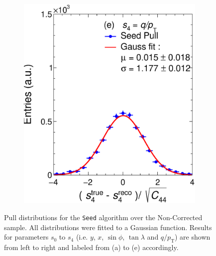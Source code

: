 \begin{figure}[t]
\begin{subfigure}{0.32\textwidth}
         \includegraphics[width=\textwidth]{figures/ch4-KF_NDGArLite/Toy/NoCorr/UnitSeed_p4.eps}
         \caption{}
         \label{fig:resp4Seed_GArLite_NoCorr}
     \end{subfigure}
        \caption[Pull distributions for the \texttt{Seed} algorithm over the Non-Corrected sample.]{Pull distributions for the \texttt{Seed} algorithm over the Non-Corrected sample. All distributions were fitted to a Gaussian function. Results for parameters $s_0$ to $s_4$ (i.e. $y$, $x$, $\sin\phi$, $\tan\lambda$ and $q/p_{\text{T}}$) are shown from left to right and labeled from (a) to (e) accordingly. }
        \label{fig:ToyUnitSeed_GArLite_NoCorr}
\end{figure}

